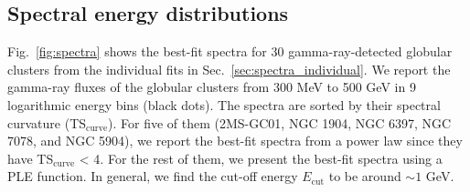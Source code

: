 \documentclass[doublespace,nopageskip]{VTthesis}
\begin{document}
\begin{appendices}


\section{Spectral energy distributions}\label{appx:spectra}

Fig.~\ref{fig:spectra} shows the best-fit spectra for 30 gamma-ray-detected globular clusters from the individual fits in Sec.~\ref{sec:spectra_individual}. We report the gamma-ray fluxes of the globular clusters from 300 MeV to 500 GeV in 9 logarithmic energy bins (black dots). The spectra are sorted by their spectral curvature (TS$_\mathrm{curve}$). For five of them (2MS-GC01, NGC 1904, NGC 6397, NGC 7078, and NGC 5904), we report the best-fit spectra from a power law since they have TS$_\mathrm{curve}$ < 4. For the rest of them, we present the best-fit spectra using a PLE function. In general, we find the cut-off energy $E_\mathrm{cut}$ to be around $\sim 1$ GeV.


\end{appendices}
\end{document}
